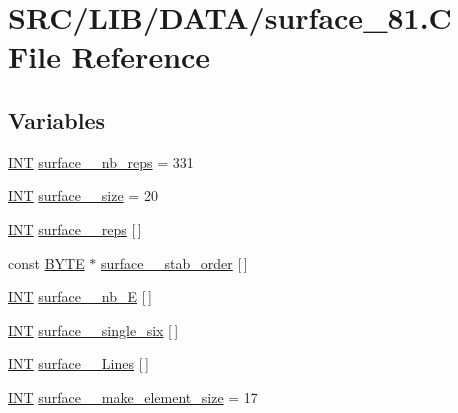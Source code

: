 \hypertarget{surface__81_8_c}{}\section{S\+R\+C/\+L\+I\+B/\+D\+A\+T\+A/surface\+\_\+81.C File Reference}
\label{surface__81_8_c}
\subsection*{Variables}
\begin{DoxyCompactItemize}
\item 
\mbox{\hyperlink{galois_8h_a09fddde158a3a20bd2dcadb609de11dc}{I\+NT}} \mbox{\hyperlink{surface__81_8_c_a6b8b2172079440b82ebd68b0dcb4f623}{surface\+\_\+\_\+nb\+\_\+reps}} = 331
\item 
\mbox{\hyperlink{galois_8h_a09fddde158a3a20bd2dcadb609de11dc}{I\+NT}} \mbox{\hyperlink{surface__81_8_c_a7b56f3ec4a743fb8ea059a72192b47b6}{surface\+\_\+\_\+size}} = 20
\item 
\mbox{\hyperlink{galois_8h_a09fddde158a3a20bd2dcadb609de11dc}{I\+NT}} \mbox{\hyperlink{surface__81_8_c_a0014bf36c9f962af1d9db0da4783c3bb}{surface\+\_\+\_\+reps}} \mbox{[}$\,$\mbox{]}
\item 
const \mbox{\hyperlink{galois_8h_ab6cc7b4aeb6ea31aba2b3fbfc83ff5e6}{B\+Y\+TE}} $\ast$ \mbox{\hyperlink{surface__81_8_c_ac5f9cb387481a2d0997d6657dd25eea5}{surface\+\_\+\_\+stab\+\_\+order}} \mbox{[}$\,$\mbox{]}
\item 
\mbox{\hyperlink{galois_8h_a09fddde158a3a20bd2dcadb609de11dc}{I\+NT}} \mbox{\hyperlink{surface__81_8_c_a5668fef6ef76cb94f5c8405261b4d841}{surface\+\_\+\_\+nb\+\_\+E}} \mbox{[}$\,$\mbox{]}
\item 
\mbox{\hyperlink{galois_8h_a09fddde158a3a20bd2dcadb609de11dc}{I\+NT}} \mbox{\hyperlink{surface__81_8_c_ae270ef66efba81381af20ce3c7a54fdf}{surface\+\_\+\_\+single\+\_\+six}} \mbox{[}$\,$\mbox{]}
\item 
\mbox{\hyperlink{galois_8h_a09fddde158a3a20bd2dcadb609de11dc}{I\+NT}} \mbox{\hyperlink{surface__81_8_c_a8a8676e6361d51cbdbd28ed9f12dcdc6}{surface\+\_\+\_\+\+Lines}} \mbox{[}$\,$\mbox{]}
\item 
\mbox{\hyperlink{galois_8h_a09fddde158a3a20bd2dcadb609de11dc}{I\+NT}} \mbox{\hyperlink{surface__81_8_c_abd8e27d3fb0bf63463539b34f36db19f}{surface\+\_\+\_\+make\+\_\+element\+\_\+size}} = 17
\item 

\end{DoxyCompactItemize}
